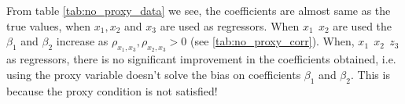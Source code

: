 From table \autoref{tab:no_proxy_data} we see, the coefficients are almost same as the true values, when $x_1 , x_2$ and $x_3$ are used as regressors. When $x_1 \ \ x_2$ are used the $\beta_1$ and $\beta_2$ increase as $\rho_{x_1 , x_3} , \rho_{x_2 , x_3} > 0$ (see \autoref{tab:no_proxy_corr}). When, $x_1 \ \ x_2 \ \ z_3$ as regressors, there is no significant improvement in the coefficients obtained, i.e. using the proxy variable doesn't solve the bias on coefficients $\beta_1$ and $\beta_2$. This is because the proxy condition is not satisfied!


    
